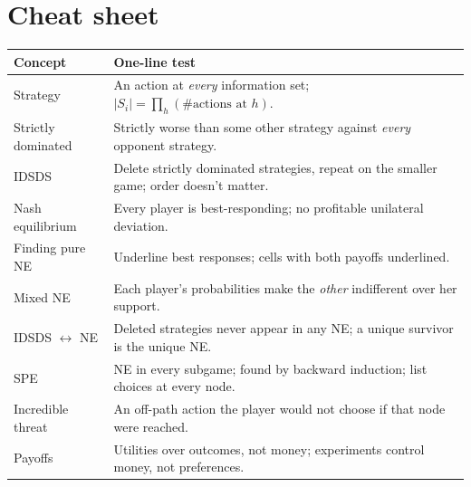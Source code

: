 \documentclass[11pt]{article}
\begin{document}
\section*{Cheat sheet}
\begin{center}
\renewcommand{\arraystretch}{1.25}
\begin{tabular}{p{}p{}}
\hline
\textbf{Concept} & \textbf{One-line test} \\ \hline
Strategy & An action at \emph{every} information set; $|S_i|=\prod_h(\#\text{actions at }h)$. \\
Strictly dominated & Strictly worse than some other strategy against \emph{every} opponent strategy. \\
IDSDS & Delete strictly dominated strategies, repeat on the smaller game; order doesn't matter. \\
Nash equilibrium & Every player is best-responding; no profitable unilateral deviation. \\
Finding pure NE & Underline best responses; cells with both payoffs underlined. \\
Mixed NE & Each player's probabilities make the \emph{other} indifferent over her support. \\
IDSDS $\leftrightarrow$ NE & Deleted strategies never appear in any NE; a unique survivor is the unique NE. \\
SPE & NE in every subgame; found by backward induction; list choices at every node. \\
Incredible threat & An off-path action the player would not choose if that node were reached. \\
Payoffs & Utilities over outcomes, not money; experiments control money, not preferences. \\ \hline
\end{tabular}
\end{center}
\end{document}
